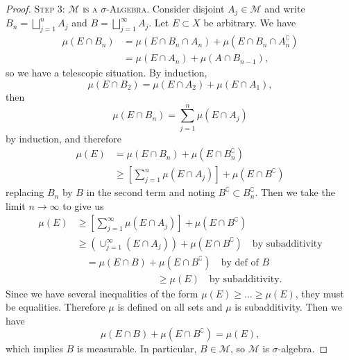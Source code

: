 \begin{proof}
\textsc{Step 3: $\mathcal{M}$ is a $\sigma$-Algebra.}
Consider disjoint $A_{j}\in\mathcal{M}$ and write $B_{n}=\bigsqcup^{n}_{j=1}A_{j}$
and $B=\bigsqcup^{\infty}_{j=1}A_{j}$. Let $E\subset X$ be arbitrary.
We have
\begin{subequations}
  \begin{align}
\mu(E\cap B_{n}) &= \mu(E\cap B_{n}\cap A_{n})+\mu(E\cap B_{n}\cap A_{n}^{\complement})\\
&=\mu(E\cap A_{n})+\mu(A\cap B_{n-1}),
  \end{align}
\end{subequations}
so we have a telescopic situation. By induction,
\begin{equation}
\mu(E\cap B_{2})=\mu(E\cap A_{2})+\mu(E\cap A_{1}),
\end{equation}
then
\begin{equation}
\mu(E\cap B_{n})=\sum^{n}_{j=1}\mu(E\cap A_{j})
\end{equation}
by induction, and therefore
\begin{subequations}
  \begin{align}
\mu(E) &= \mu(E\cap B_{n})+\mu(E\cap B_{n}^{\complement})\\
&\geq[\sum^{n}_{j=1}\mu(E\cap A_{j})]+\mu(E\cap B^{\complement})
  \end{align}
\end{subequations}
replacing $B_{n}$ by $B$ in the second term and noting
$B^{\complement}\subset B_{n}^{\complement}$. Then we take the limit
$n\to\infty$ to give us
\begin{subequations}
  \begin{align}
\mu(E)&\geq[\sum^{\infty}_{j=1}\mu(E\cap A_{j})]+\mu(E\cap B^{\complement})\\
&\geq\left(\cup^{\infty}_{j=1}(E\cap A_{j})\right)+\mu(E\cap B^{\complement})\quad\mbox{by subadditivity}\\
&\quad=\mu(E\cap B)+\mu(E\cap B^{\complement})\quad\mbox{by def of $B$}\\
&\quad\phantom{=\mu(E\cap B)}\quad\geq\mu(E)\quad\mbox{by subadditivity}.
  \end{align}
\end{subequations}
Since we have several inequalities of the form $\mu(E)\geq\dots\geq\mu(E)$,
they must be equalities. Therefore $\mu$ is defined on all sets and
$\mu$ is subadditivity. Then we have
\begin{equation}
\mu(E\cap B)+\mu(E\cap B^{\complement})=\mu(E),
\end{equation}
which implies $B$ is measurable. In particular, $B\in\mathcal{M}$, so
$\mathcal{M}$ is $\sigma$-algebra.


\end{proof}

